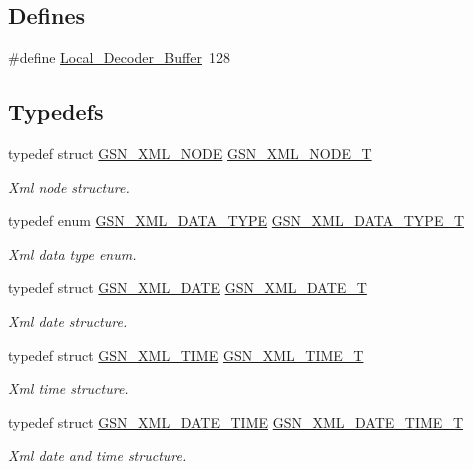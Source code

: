 \subsection*{Defines}
\begin{DoxyCompactItemize}
\item 
\#define \hyperlink{a00616_a32c1a252fccb70a1e2b8824f282a30ef}{Local\_\-Decoder\_\-Buffer}~128
\end{DoxyCompactItemize}
\subsection*{Typedefs}
\begin{DoxyCompactItemize}
\item 
typedef struct \hyperlink{a00434}{GSN\_\-XML\_\-NODE} \hyperlink{a00679_gafab64ea302554cb05912c7c04d943fe8}{GSN\_\-XML\_\-NODE\_\-T}
\begin{DoxyCompactList}\small\item\em Xml node structure. \end{DoxyCompactList}\item 
typedef enum \hyperlink{a00679_ga0ed9af8f445f8406f6a0a2a84e40eb81}{GSN\_\-XML\_\-DATA\_\-TYPE} \hyperlink{a00679_ga481bc889c92734a49552fb759166b14a}{GSN\_\-XML\_\-DATA\_\-TYPE\_\-T}
\begin{DoxyCompactList}\small\item\em Xml data type enum. \end{DoxyCompactList}\item 
typedef struct \hyperlink{a00431}{GSN\_\-XML\_\-DATE} \hyperlink{a00679_ga3faa58b86cf0dbe597351c634a76b044}{GSN\_\-XML\_\-DATE\_\-T}
\begin{DoxyCompactList}\small\item\em Xml date structure. \end{DoxyCompactList}\item 
typedef struct \hyperlink{a00437}{GSN\_\-XML\_\-TIME} \hyperlink{a00679_ga227674b6a3bbe3f3ce354c361344dacc}{GSN\_\-XML\_\-TIME\_\-T}
\begin{DoxyCompactList}\small\item\em Xml time structure. \end{DoxyCompactList}\item 
typedef struct \hyperlink{a00432}{GSN\_\-XML\_\-DATE\_\-TIME} \hyperlink{a00679_ga6a6787f5abff9dee0723c437f3ce3fb4}{GSN\_\-XML\_\-DATE\_\-TIME\_\-T}
\begin{DoxyCompactList}\small\item\em Xml date and time structure. \end{DoxyCompactList}\item 

\end{DoxyCompactItemize}
